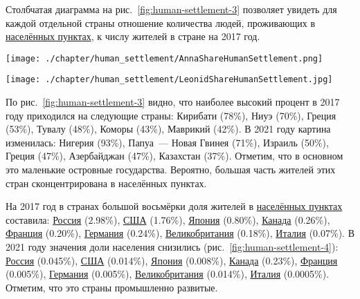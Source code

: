 Столбчатая диаграмма на рис.~\ref{fig:human-settlement-3} позволяет увидеть для каждой отдельной страны отношение количества людей, проживающих в \href{http://www.wikidata.org/entity/Q486972}{населённых пунктах}, к числу жителей в стране на 2017 год.

\begin{figure*}
    \texttt{[image: ./chapter/human\_settlement/AnnaShareHumanSettlement.png]}
	\label{fig:human-settlement-3}
	\caption[Диаграмма доли населения страны, 2017.]{Диаграмма доли населения страны, проживающего в <<населённых пунктах>> на 2017 год. Ссылка на SPARQL-запрос: \href{https://w.wiki/4dE3}{https://w.wiki/4dE3}}%
\end{figure*} 

\begin{figure*}
    \texttt{[image: ./chapter/human\_settlement/LeonidShareHumanSettlement.jpg]}
	\label{fig:human-settlement-4}
	\caption[Диаграмма доли населения страны, 2021.]{Диаграмма доли населения страны, проживающего в <<населённых пунктах>> на 2021 год. Были выбраны страны с населением более 5 млн чел. SPARQL-запрос: \href{https://w.wiki/4dDx}{https://w.wiki/4dDx}}%
\end{figure*} 

По рис.~\ref{fig:human-settlement-3} видно, 
что наиболее высокий процент в 2017 году приходился на следующие страны: 
Кирибати (78\%), Ниуэ (70\%), Греция (53\%), Тувалу (48\%), Коморы (43\%), Маврикий (42\%). 
В 2021 году картина изменилась: Нигерия (93\%), Папуа~--- Новая Гвинея (71\%), 
Израиль (50\%), Греция (47\%), Азербайджан (47\%), Казахстан (37\%). 
Отметим, что в основном это маленькие островные государства. 
Вероятно, большая часть жителей этих стран сконцентрирована в населённых пунктах.

На 2017 год в странах большой восьмёрки доля жителей 
в \href{http://www.wikidata.org/entity/Q486972}{населённых пунктах} составила: 
\href{http://www.wikidata.org/entity/Q159}{Россия} (\num{2.98}\%), 
\href{http://www.wikidata.org/entity/Q30}{США} (\num{1.76}\%), 
\href{http://www.wikidata.org/entity/Q17}{Япония} (\num{0.80}\%), 
\href{http://www.wikidata.org/entity/Q16}{Канада} (\num{0.26}\%), 
\href{http://www.wikidata.org/entity/Q142}{Франция} (\num{0.20}\%), 
\href{http://www.wikidata.org/entity/Q183}{Германия} (\num{0.24}\%), 
\href{http://www.wikidata.org/entity/Q145}{Великобритания} (\num{0.18}\%), 
\href{http://www.wikidata.org/entity/Q38}{Италия} (\num{0.07}\%). 
В 2021 году значения доли населения снизились (рис.~\ref{fig:human-settlement-4}): 
\href{http://www.wikidata.org/entity/Q159}{Россия} (0.045\%), 
\href{http://www.wikidata.org/entity/Q30}{США} (\num{0.014}\%), 
\href{http://www.wikidata.org/entity/Q17}{Япония} (\num{0.008}\%), 
\href{http://www.wikidata.org/entity/Q16}{Канада} (\num{0.23}\%), 
\href{http://www.wikidata.org/entity/Q142}{Франция} (\num{0.005}\%), 
\href{http://www.wikidata.org/entity/Q183}{Германия} (\num{0.005}\%), 
\href{http://www.wikidata.org/entity/Q145}{Великобритания} (\num{0.014}\%), 
\href{http://www.wikidata.org/entity/Q38}{Италия} (\num{0.0005}\%). 
Отметим, что это страны промышленно развитые.


